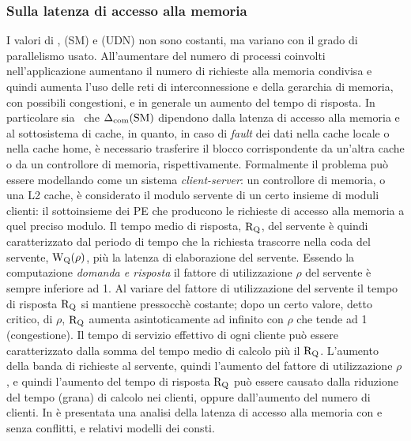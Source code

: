 \subsubsection{Sulla latenza di accesso alla memoria}
\label{sct:client_server}
I valori di \Tcalc, \deltacom(SM) e \deltacom(UDN) non sono costanti, ma variano con il  grado di parallelismo usato. All'aumentare del numero di processi coinvolti nell'applicazione aumentano il numero di richieste alla memoria condivisa e quindi aumenta l'uso delle reti di interconnessione e della gerarchia di memoria, con possibili congestioni, e in generale un aumento del tempo di risposta.
In particolare sia \Tcalc\ che $\Delta_{\mathrm{com}}(\mathrm{SM})$ dipendono dalla latenza di accesso alla memoria e al sottosistema di cache, in quanto, in caso di \emph{fault} dei dati nella cache locale o nella cache home, \`e necessario trasferire il blocco corrispondente da un'altra cache o da un controllore di memoria, rispettivamente. Formalmente il problema pu\`o essere modellando come un sistema \emph{client-server}: un controllore di memoria, o una L2 cache, \`e considerato il modulo servente di un certo insieme di moduli clienti: il sottoinsieme dei PE che producono le richieste di accesso alla memoria a quel preciso modulo. Il tempo medio di risposta, $\mathrm{R}_{\mathrm{Q}}$, del servente \`e quindi caratterizzato dal periodo di tempo che la richiesta trascorre nella coda del servente, $\mathrm{W}_{\mathrm{Q}}(\rho)$, pi\`u la latenza di elaborazione del servente. Essendo la computazione \emph{domanda e risposta} il fattore di utilizzazione $\rho$ del servente \`e sempre inferiore ad 1. Al variare del fattore di utilizzazione del servente il tempo di risposta $\mathrm{R}_{\mathrm{Q}}$ si mantiene pressocch\`e costante; dopo un certo valore, detto critico, di $\rho$, $\mathrm{R}_{\mathrm{Q}}$ aumenta asintoticamente ad infinito con $\rho$ che tende ad 1 (congestione). Il tempo di servizio effettivo di ogni cliente pu\`o essere caratterizzato dalla somma del tempo medio di calcolo pi\`u il $\mathrm{R}_{\mathrm{Q}}$. L'aumento della banda di richieste al servente, quindi l'aumento del fattore di utilizzazione $\rho$, e quindi l'aumento del tempo di risposta $\mathrm{R}_{\mathrm{Q}}$ pu\`o essere causato dalla riduzione del tempo (grana) di calcolo nei clienti, oppure dall'aumento del numero di clienti. In \cite{hpc_part2} \`e presentata una analisi della latenza di accesso alla memoria con e senza conflitti, e relativi modelli dei consti.

